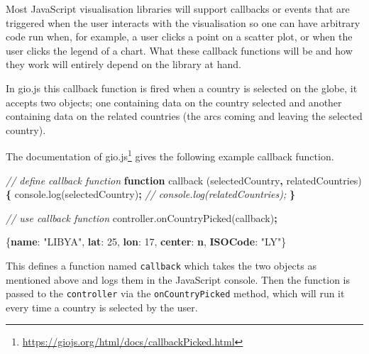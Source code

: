 \documentclass[
]{krantz}
\makeatletter
\newenvironment{Shaded}{\begin{snugshade}}{\end{snugshade}}
\newcommand{\AttributeTok}[1]{\textcolor[rgb]{0.61,0.61,0.61}{#1}}
\newcommand{\CommentTok}[1]{\textcolor[rgb]{0.37,0.37,0.37}{\textit{#1}}}
\newcommand{\DecValTok}[1]{\textcolor[rgb]{0.06,0.06,0.06}{#1}}
\newcommand{\ErrorTok}[1]{\textcolor[rgb]{0.14,0.14,0.14}{\textbf{#1}}}
\newcommand{\FunctionTok}[1]{\textcolor[rgb]{0,0,0}{#1}}
\newcommand{\KeywordTok}[1]{\textcolor[rgb]{0.27,0.27,0.27}{\textbf{#1}}}
\newcommand{\NormalTok}[1]{#1}
\newcommand{\OperatorTok}[1]{\textcolor[rgb]{0.43,0.43,0.43}{\textbf{#1}}}
\newcommand{\StringTok}[1]{\textcolor[rgb]{0.5,0.5,0.5}{#1}}
\newcommand{\VariableTok}[1]{\textcolor[rgb]{0,0,0}{#1}}
\renewcommand{\href}[2]{#2\footnote{\url{#1}}}
\newenvironment{kframe}{%
\medskip{}
\setlength{\fboxsep}{.8em}
 \def\at@end@of@kframe{}%
 \ifinner\ifhmode%
  \def\at@end@of@kframe{\end{minipage}}%
  \begin{minipage}{\columnwidth}%
 \fi\fi%
 \def\FrameCommand##1{\hskip\@totalleftmargin \hskip-\fboxsep
 \colorbox{shadecolor}{##1}\hskip-\fboxsep
     \hskip-\linewidth \hskip-\@totalleftmargin \hskip\columnwidth}%
 \MakeFramed {\advance\hsize-\width
   \@totalleftmargin\z@ \linewidth\hsize
   \@setminipage}}%
 {\par\unskip\endMakeFramed%
 \at@end@of@kframe}
\renewenvironment{Shaded}{\begin{kframe}}{\end{kframe}}
\makeatother
\begin{document}
Most JavaScript visualisation libraries will support callbacks or events that are triggered when the user interacts with the visualisation so one can have arbitrary code run when, for example, a user clicks a point on a scatter plot, or when the user clicks the legend of a chart. What these callback functions will be and how they work will entirely depend on the library at hand.

In gio.js this callback function is fired when a country is selected on the globe, it accepts two objects; one containing data on the country selected and another containing data on the related countries (the arcs coming and leaving the selected country).

The \href{https://giojs.org/html/docs/callbackPicked.html}{documentation of gio.js} gives the following example callback function.

\begin{Shaded}
\begin{Highlighting}[]
\CommentTok{// define callback function}
\KeywordTok{function} \AttributeTok{callback}\NormalTok{ (selectedCountry}\OperatorTok{,}\NormalTok{ relatedCountries) }\OperatorTok{\{}
  \VariableTok{console}\NormalTok{.}\AttributeTok{log}\NormalTok{(selectedCountry)}\OperatorTok{;}
  \CommentTok{// console.log(relatedCountries);}
\OperatorTok{\}}

\CommentTok{// use callback function}
\VariableTok{controller}\NormalTok{.}\AttributeTok{onCountryPicked}\NormalTok{(callback)}\OperatorTok{;}
\end{Highlighting}
\end{Shaded}

\begin{Shaded}
\begin{Highlighting}[]
\FunctionTok{\{}\ErrorTok{name}\FunctionTok{:} \StringTok{"LIBYA"}\FunctionTok{,} \ErrorTok{lat}\FunctionTok{:} \DecValTok{25}\FunctionTok{,} \ErrorTok{lon}\FunctionTok{:} \DecValTok{17}\FunctionTok{,} \ErrorTok{center}\FunctionTok{:} \ErrorTok{n}\FunctionTok{,} \ErrorTok{ISOCode}\FunctionTok{:} \StringTok{"LY"}\FunctionTok{\}}
\end{Highlighting}
\end{Shaded}

This defines a function named \texttt{callback} which takes the two objects as mentioned above and logs them in the JavaScript console. Then the function is passed to the \texttt{controller} via the \texttt{onCountryPicked} method, which will run it every time a country is selected by the user.
\end{document}
